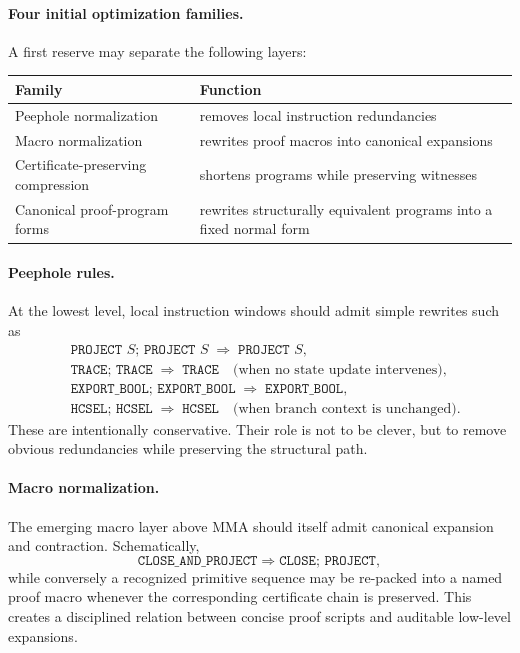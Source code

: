 \paragraph{Four initial optimization families.}
A first reserve may separate the following layers:
\begin{center}
\begin{tabular}{@{}>{\raggedright\arraybackslash}p{}>{\raggedright\arraybackslash}p{}@{}}
\toprule
Family & Function \\
\midrule
Peephole normalization & removes local instruction redundancies \\
Macro normalization & rewrites proof macros into canonical expansions \\
Certificate-preserving compression & shortens programs while preserving witnesses \\
Canonical proof-program forms & rewrites structurally equivalent programs into a fixed normal form \\
\bottomrule
\end{tabular}
\end{center}

\paragraph{Peephole rules.}
At the lowest level, local instruction windows should admit simple rewrites such as
\begin{align*}
&\texttt{PROJECT }S;\,\texttt{PROJECT }S \;\Longrightarrow\; \texttt{PROJECT }S,\\
&\texttt{TRACE};\,\texttt{TRACE} \;\Longrightarrow\; \texttt{TRACE} \quad\text{(when no state update intervenes)},\\
&\texttt{EXPORT\_BOOL};\,\texttt{EXPORT\_BOOL} \;\Longrightarrow\; \texttt{EXPORT\_BOOL},\\
&\texttt{HCSEL};\,\texttt{HCSEL} \;\Longrightarrow\; \texttt{HCSEL} \quad\text{(when branch context is unchanged)}.
\end{align*}
These are intentionally conservative. Their role is not to be clever, but to remove obvious redundancies while preserving the structural path.

\paragraph{Macro normalization.}
The emerging macro layer above MMA should itself admit canonical expansion and contraction. Schematically,
\[
\texttt{CLOSE\_AND\_PROJECT}
\Longrightarrow
\texttt{CLOSE};\,\texttt{PROJECT},
\]
while conversely a recognized primitive sequence may be re-packed into a named proof macro whenever the corresponding certificate chain is preserved. This creates a disciplined relation between concise proof scripts and auditable low-level expansions.

